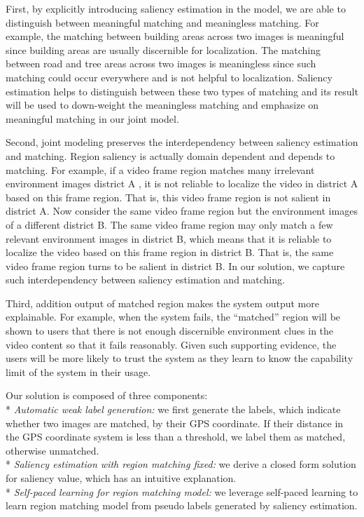 First, by explicitly introducing saliency estimation in the model, we are able to distinguish between meaningful matching and meaningless matching. 
For example, the matching between building areas across two images is meaningful since building areas are usually discernible for localization. 
The matching between road and tree areas across two images is meaningless since such matching could occur everywhere and is not helpful to localization. 
Saliency estimation helps to distinguish between these two types of matching and its result will be used to down-weight the meaningless matching and emphasize on meaningful matching in our joint model. 

Second, joint modeling preserves the interdependency between saliency estimation and matching. 
Region saliency is actually domain dependent and depends to matching. 
For example, if a video frame region matches many irrelevant environment images district A , it is not reliable to localize the video in district A based on this frame region. 
That is, this video frame region is not salient in district A. 
Now consider the same video frame region but the environment images of a different district B. 
The same video frame region may only match a few relevant environment images in district B, which means that it is reliable to localize the video based on this frame region in district B. 
That is, the same video frame region turns to be salient in district B. 
In our solution, we capture such interdependency between saliency estimation and matching. 

Third, addition output of matched region makes the system output more explainable. 
For example, when the system fails, the ``matched'' region will be shown to users that there is not enough discernible environment clues in the video content so that it fails reasonably. 
Given such supporting evidence, the users will be more likely to trust the system as they learn to know the capability limit of the system in their usage. 

Our solution is composed of three components: \\*
\emph{Automatic weak label generation: } 
we first generate the labels, which indicate whether two images are matched, by their GPS coordinate. If their distance in the GPS coordinate system is less than a threshold, we label them as matched, otherwise unmatched. \\*
\emph{Saliency estimation with region matching fixed: }
we derive a closed form solution for saliency value, which has an intuitive explanation. \\*
\emph{Self-paced learning for region matching model: }
we leverage self-paced learning to learn region matching model from pseudo labels generated by saliency estimation. 

